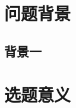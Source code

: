 \documentclass[14pt,a4paper]{xmuthesis}
\begin{document}
\section{问题背景}
\subsection{背景一}

\section{选题意义}







\begin{thesisbibliography}

\end{thesisbibliography}

\thesisappendix
\end{document}
